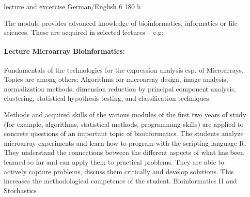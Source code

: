 {lecture and excercise}
{German/English}
{6}
{180 h}
{The module provides advanced knowledge of bioinformatics, informatics or life sciences. These are acquired in selected lectures -- e.g:
\paragraph{Lecture Microarray Bioinformatics:} Fundamentals of the technologies for the expression analysis esp. of Microarrays. 
Topics are among others: Algorithms for microarray design, image analysis, normalization methods, dimension reduction by principal component analysis, clustering, statistical hypothesis testing, and classification techniques.}
{Methods and acquired skills of the various modules of the first two years of study (for example, algorithms, statistical methods, programming skills) are applied to concrete questions of an important topic of bioinformatics. 
The students analyze microarray experiments and learn how to program with the scripting language R.
They understand the connections between the different aspects of what has been learned so far and can apply them to practical problems.
They are able to actively capture problems, discuss them critically and develop solutions. This increases the methodological competence of the student.}
{Bioinformatics II and Stochastics}